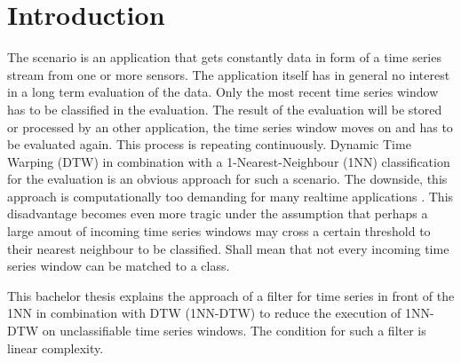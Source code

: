 \section{Introduction}
The scenario is an application that gets constantly data in form of a time series stream from one or more sensors. The
application itself has in general no interest in a long term evaluation of the data. Only the most recent time series
window has to be classified in the evaluation. The result of the evaluation will be stored or processed by an other
application, the time series window moves on and has to be evaluated again. This process is repeating continuously.
Dynamic Time Warping (DTW) in combination with a 1-Nearest-Neighbour (1NN) classification for the evaluation is an
obvious approach for such a scenario. The downside, this approach is computationally too demanding for many realtime
applications \cite{xi2006fast}. This disadvantage becomes even more tragic under the assumption that perhaps a large
amout of incoming time series windows may cross a certain threshold to their nearest neighbour to be classified. Shall
mean that not every incoming time series window can be matched to a class.

This bachelor thesis explains the approach of a filter for time series in front of the 1NN in combination with DTW
(1NN-DTW) to reduce the execution of 1NN-DTW on unclassifiable time series windows. The condition for such a filter is
linear complexity.
